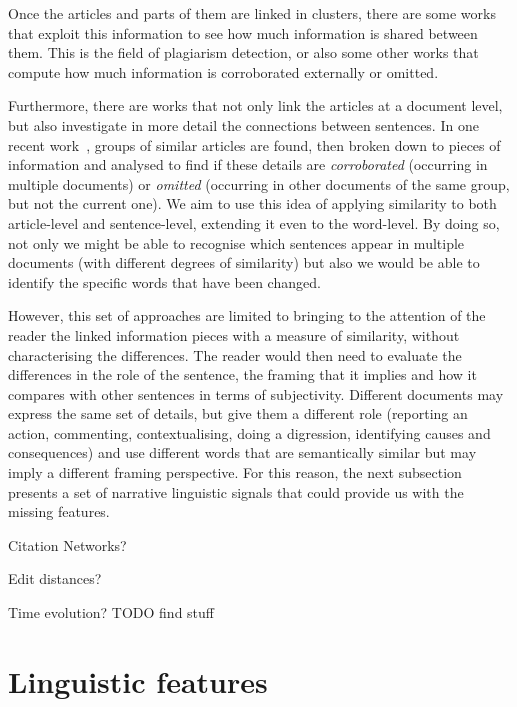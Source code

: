 Once the articles and parts of them are linked in clusters, there are some works that exploit this information to see how much information is shared between them. This is the field of plagiarism detection, or also some other works that compute how much information is corroborated externally or omitted.

Furthermore, there are works that not only link the articles at a document level, but also investigate in more detail the connections between sentences.
In one recent work~\cite{bountouridis2018explaining}, groups of similar articles are found, then broken down to pieces of information and analysed to find if these details are \emph{corroborated} (occurring in multiple documents) or \emph{omitted} (occurring in other documents of the same group, but not the current one). 
We aim to use this idea of applying similarity to both article-level and sentence-level, extending it even to the word-level. By doing so,
not only we might be able to recognise which sentences appear in multiple documents (with different degrees of similarity) but also we would be able to identify the specific words that have been changed.


However, this set of approaches are limited to bringing to the attention of the reader the linked information pieces with a measure of similarity, without characterising the differences. The reader would then need to evaluate the differences in the role of the sentence, the framing that it implies and how it compares with other sentences in terms of subjectivity.
Different documents may express the same set of details, but give them a different role (reporting an action, commenting, contextualising, doing a digression, identifying causes and consequences) and use different words that are semantically similar but may imply a different framing perspective.
For this reason, the next subsection presents a set of narrative linguistic signals that could provide us with the missing features.

Citation Networks?

Edit distances?

Time evolution? TODO find stuff



\section{Linguistic features}

